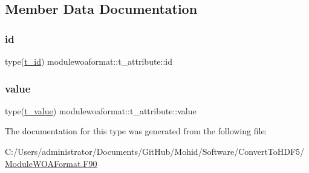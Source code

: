 \subsection{Member Data Documentation}
\mbox{\label{structmodulewoaformat_1_1t__attribute_aa0124da484fe72fc4239e79708aefe82}} 
\subsubsection{\texorpdfstring{id}{id}}
{\footnotesize\ttfamily type(\mbox{\hyperlink{structmodulewoaformat_1_1t__id}{t\+\_\+id}}) modulewoaformat\+::t\+\_\+attribute\+::id\hspace{0.3cm}{\ttfamily [private]}}

\mbox{\label{structmodulewoaformat_1_1t__attribute_a114c8fde3dc2a2ea25f00197162221a3}} 
\subsubsection{\texorpdfstring{value}{value}}
{\footnotesize\ttfamily type(\mbox{\hyperlink{structmodulewoaformat_1_1t__value}{t\+\_\+value}}) modulewoaformat\+::t\+\_\+attribute\+::value\hspace{0.3cm}{\ttfamily [private]}}



The documentation for this type was generated from the following file\+:\begin{DoxyCompactItemize}
\item 
C\+:/\+Users/administrator/\+Documents/\+Git\+Hub/\+Mohid/\+Software/\+Convert\+To\+H\+D\+F5/\mbox{\hyperlink{_module_w_o_a_format_8_f90}{Module\+W\+O\+A\+Format.\+F90}}\end{DoxyCompactItemize}
